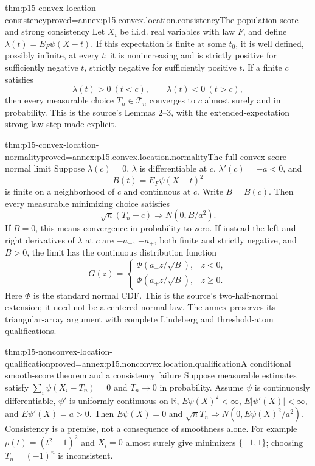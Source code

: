 \begin{hbtheorem}{thm:p15-convex-location-consistency}{proved=annex:p15.convex.location.consistency}{The population score and strong consistency}
Let \(X_i\) be i.i.d. real variables with law \(F\), and define
\(\lambda(t)=E_F\psi(X-t)\). If this expectation is finite at some
\(t_0\), it is well defined, possibly infinite, at every \(t\);
it is nonincreasing and is strictly positive for sufficiently negative
\(t\), strictly negative for sufficiently positive \(t\).
If a finite \(c\) satisfies
\[
 \lambda(t)>0\ (t<c),\qquad \lambda(t)<0\ (t>c),
\]
then every measurable choice \(T_n\in\mathcal T_n\) converges to \(c\)
almost surely and in probability. This is the source's Lemmas 2--3,
with the extended-expectation strong-law step made explicit.
\end{hbtheorem}

\begin{hbtheorem}{thm:p15-convex-location-normality}{proved=annex:p15.convex.location.normality}{The full convex-score normal limit}
Suppose \(\lambda(c)=0\), \(\lambda\) is differentiable at \(c\),
\(\lambda'(c)=-a<0\), and
\[
 B(t)=E_F\psi(X-t)^2
\]
is finite on a neighborhood of \(c\) and continuous at \(c\).
Write \(B=B(c)\). Then every measurable minimizing choice satisfies
\[
 \sqrt n(T_n-c)\Rightarrow N(0,B/a^2).
\]
If \(B=0\), this means convergence in probability to zero.
If instead the left and right derivatives of \(\lambda\) at \(c\)
are \(-a_-\), \(-a_+\), both finite and strictly negative, and \(B>0\),
the limit has the continuous distribution function
\[
 G(z)=
 \begin{cases}
 \Phi(a_-z/\sqrt B),&z<0,\\
 \Phi(a_+z/\sqrt B),&z\geq0.
 \end{cases}
\]
Here \(\Phi\) is the standard normal CDF. This is the source's
two-half-normal extension; it need not be a centered normal law.
The annex preserves its triangular-array argument with complete
Lindeberg and threshold-atom qualifications.
\end{hbtheorem}

\begin{hbtheorem}{thm:p15-nonconvex-location-qualification}{proved=annex:p15.nonconvex.location.qualification}{A conditional smooth-score theorem and a consistency failure}
Suppose measurable estimates satisfy
\(\sum_i\psi(X_i-T_n)=0\) and \(T_n\to0\) in probability.
Assume \(\psi\) is continuously differentiable, \(\psi'\) is uniformly
continuous on \(\mathbb R\), \(E\psi(X)^2<\infty\),
\(E|\psi'(X)|<\infty\), and \(E\psi'(X)=a>0\).
Then \(E\psi(X)=0\) and
\(\sqrt n T_n\Rightarrow N(0,E\psi(X)^2/a^2)\).
Consistency is a premise, not a consequence of smoothness alone.
For example \(\rho(t)=(t^2-1)^2\) and \(X_i=0\) almost surely give
minimizers \(\{-1,1\}\); choosing \(T_n=(-1)^n\) is inconsistent.
\end{hbtheorem}

